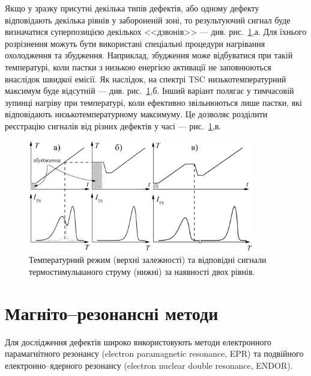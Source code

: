 \documentclass[10pt,a5paper,titlepage,oneside]{book}
\numberwithin{equation}{part}
\begin{document}
Якщо у зразку присутні декілька типів дефектів, або одному дефекту
відповідають декілька рівнів у забороненій зоні,
то результуючий сигнал буде визначатися суперпозицією
декількох <<дзвонів>> --- див. рис.~\ref{F42},а.
Для їхнього розрізнення можуть бути використані спеціальні
процедури нагрівання охолодження та збудження.
Наприклад, збудження може відбуватися при такій температурі,
коли пастки з низькою енергією активації не заповнюються внаслідок
швидкої емісії.
Як наслідок, на спектрі TSC низькотемпературний максимум буде відсутній --- див. рис.~\ref{F42},б.
Інший варіант полягає у тимчасовій зупинці нагріву при температурі, коли ефективно звільнюються
лише пастки, які відповідають низькотемпературному максимуму.
Це дозволяє розділити реєстрацію сигналів від різних дефектів у часі --- рис.~\ref{F42},в.

\begin{figure}[b]
\center
\vspace{-2mm}
\includegraphics[width=0.88\textwidth]{Fig4_2}
\vspace{-3mm}
\caption{Температурний режим (верхні залежності) та 
відповідні сигнали термостимульваного струму (нижні)
за наявності двох рівнів.}
\vspace{-3mm}
\label{F42}
\end{figure}


\chapter{Магніто--резонансні методи}\label{chapER}

Для дослідження дефектів широко використовують
методи електронного парамагнітного резонансу 
(electron paramagnetic resonance, EPR) та подвійного електронно--ядерного резонансу
(electron nuclear double resonance, ENDOR).
\end{document}
